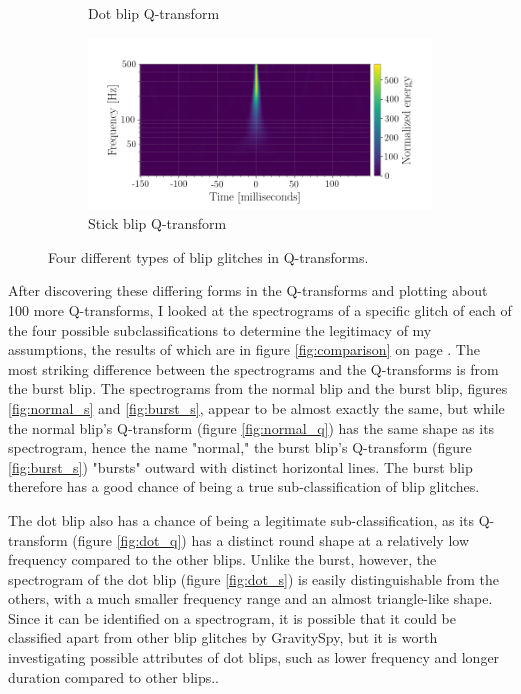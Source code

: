 \documentclass[a4paper]{article}
\begin{document}
\begin{figure}
\begin{subfigure}{.49\textwidth}
		\caption{Dot blip Q-transform}
		\label{fig:dot}
	\end{subfigure}
	\begin{subfigure}{.49\textwidth}
		\centering
		\includegraphics[width=1\linewidth]{stick_blip}
		\caption{Stick blip Q-transform}
		\label{fig:stick}
	\end{subfigure}
	\caption{Four different types of blip glitches in Q-transforms.}
	\label{fig:q_transforms}
\end{figure}

After discovering these differing forms in the Q-transforms and plotting about 100 more Q-transforms, I looked at the spectrograms of a specific glitch of each of the four possible subclassifications to determine the legitimacy of my assumptions, the results of which are in figure \ref{fig:comparison} on page \pageref{fig:comparison}. The most striking difference between the spectrograms and the Q-transforms is from the burst blip. The spectrograms from the normal blip and the burst blip, figures \ref{fig:normal_s} and \ref{fig:burst_s}, appear to be almost exactly the same, but while the normal blip's Q-transform (figure \ref{fig:normal_q}) has the same shape as its spectrogram, hence the name "normal," the burst blip's Q-transform (figure \ref{fig:burst_s}) "bursts" outward with distinct horizontal lines. The burst blip therefore has a good chance of being a true sub-classification of blip glitches. 

The dot blip also has a chance of being a legitimate sub-classification, as its Q-transform (figure \ref{fig:dot_q}) has a distinct round shape at a relatively low frequency compared to the other blips. Unlike the burst, however, the spectrogram of the dot blip (figure \ref{fig:dot_s}) is easily distinguishable from the others, with a much smaller frequency range and an almost triangle-like shape. Since it can be identified on a spectrogram, it is possible that it could be classified apart from other blip glitches by GravitySpy, but it is worth investigating possible attributes of dot blips, such as lower frequency and longer duration compared to other blips..
\end{document}

